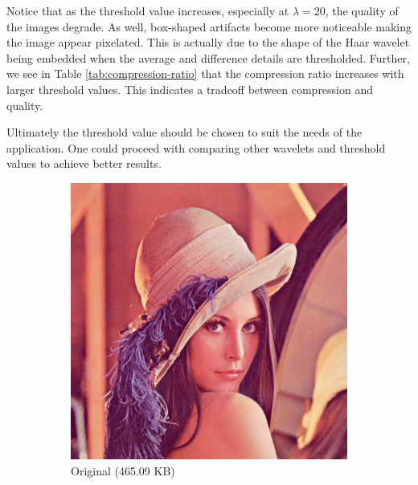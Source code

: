 \documentclass[12pt]{article}
\theoremstyle{definition}
\begin{document}
  Notice that as the threshold value increases, especially at \(\lambda = 20\), the quality of the images degrade. As well, box-shaped artifacts become more noticeable making the image appear pixelated. This is actually due to the shape of the Haar wavelet being embedded when the average and difference details are thresholded. Further, we see in Table \ref{tab:compression-ratio} that the compression ratio increases with larger threshold values. This indicates a tradeoff between compression and quality.
  
  Ultimately the threshold value should be chosen to suit the needs of the application. One could proceed with comparing other wavelets and threshold values to achieve better results.


  \begin{figure}
    \centering
    \begin{subfigure}[t]{.49\linewidth}
      \centering
      \includegraphics[width=.93\linewidth]{figs/lena.png}
      \caption{Original (465.09 KB)}
    \end{subfigure}
    \begin{subfigure}[t]{.49\linewidth}
      \centering

\end{subfigure}
\end{figure}
\end{document}
